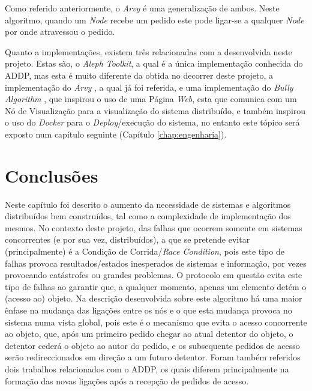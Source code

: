 Como referido anteriormente, o \emph{Arvy} é uma generalização de ambos.
Neste algoritmo, quando um \emph{Node} recebe um pedido este pode ligar-se a qualquer \emph{Node} por onde atravessou o pedido.


Quanto a implementações, existem três relacionadas com a desenvolvida neste projeto. 
Estas são, o \emph{Aleph Toolkit}\cite{aleph}, a qual é a única implementação conhecida do \acs*{ADDP}, mas esta é muito diferente da obtida no decorrer deste projeto, 
a implementação do \emph{Arvy} \cite{ArvyImpl}, a qual já foi referida, 
e uma implementação do \emph{Bully Algorithm} \cite{bully}, que inspirou o uso de uma Página \emph{Web}, esta que comunica com um Nó de Visualização para a visualização do sistema distribuído, e 
também inspirou o uso do \emph{Docker} para o \emph{Deploy}/execução do sistema, no entanto este tópico será exposto num capítulo seguinte (Capítulo \ref{chap:engenharia}).



\section{Conclusões}
\label{motivacao:sec:conclusao}

Neste capítulo foi descrito o aumento da necessidade de sistemas e algoritmos distribuídos bem construídos, tal como a complexidade de implementação dos mesmos.
No contexto deste projeto, das falhas que ocorrem somente em sistemas concorrentes (e por sua vez, distribuídos), a que se pretende evitar (principalmente)
é a Condição de Corrida/\emph{Race Condition},
pois este tipo de falhas provoca resultados/estados inesperados de sistemas e informação, por vezes provocando catástrofes ou grandes problemas.
O protocolo em questão evita este tipo de falhas ao garantir que, a qualquer momento, apenas um elemento detém o (acesso ao) objeto.
Na descrição desenvolvida sobre este algoritmo há uma maior ênfase na mudança das ligações entre os nós e o que esta mudança provoca no sistema numa vista global,
pois este é o mecanismo que evita o acesso concorrente ao objeto, que, após um primeiro pedido chegar ao atual detentor do objeto, o detentor cederá o objeto ao autor do pedido,
e os subsequente pedidos de acesso serão redireccionados em direção a um futuro detentor.
Foram também referidos dois trabalhos relacionados com o \acs*{ADDP}, os quais diferem principalmente na formação das novas ligações após a recepção de pedidos de acesso.


